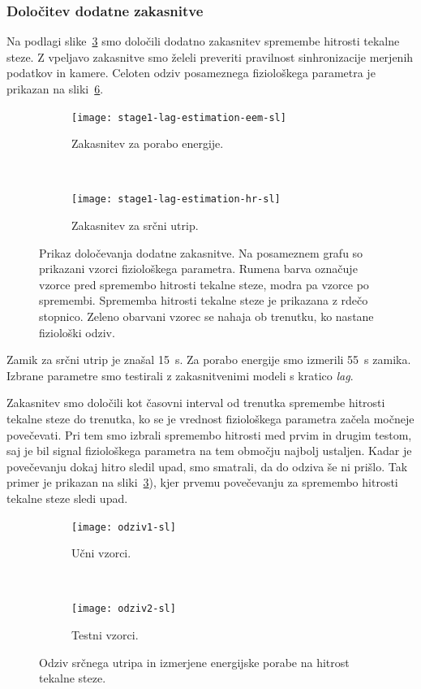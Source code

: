 \subsubsection{Določitev dodatne zakasnitve}
Na podlagi slike~\ref{fig:lag-estimation-stage1} smo določili dodatno zakasnitev spremembe hitrosti tekalne steze. Z vpeljavo zakasnitve smo želeli preveriti pravilnost sinhronizacije merjenih podatkov in kamere. Celoten odziv posameznega fiziološkega parametra je prikazan na sliki~\ref{fig:odziv-stage1}.


\begin{figure}[!htb]
	\centering
	\begin{subfigure}[t]{0.45\columnwidth}
		\texttt{[image: stage1-lag-estimation-eem-sl]}
		\caption{Zakasnitev za porabo energije.}
		\label{fig:lag-estimation-train-eem}
	\end{subfigure}
	~
	\begin{subfigure}[t]{0.45\columnwidth}
		\texttt{[image: stage1-lag-estimation-hr-sl]}
		\caption{Zakasnitev za srčni utrip.}
		\label{fig:lag-estimation-train-hr}
	\end{subfigure}
	\caption[Prikaz določevanja dodatne zakasnitve]{Prikaz določevanja dodatne zakasnitve. Na posameznem grafu so prikazani vzorci fiziološkega parametra. Rumena barva označuje vzorce pred spremembo hitrosti tekalne steze, modra pa vzorce po spremembi. Sprememba hitrosti tekalne steze je prikazana z rdečo stopnico. Zeleno obarvani vzorec se nahaja ob trenutku, ko nastane fiziološki odziv.}
	\label{fig:lag-estimation-stage1}
\end{figure}

Zamik za srčni utrip je znašal \SI{15}{\s}. Za porabo energije smo izmerili \SI{55}{\s} zamika. Izbrane parametre smo testirali z zakasnitvenimi modeli s kratico \textit{lag}.

Zakasnitev smo določili kot časovni interval od trenutka spremembe hitrosti tekalne steze do trenutka, ko se je vrednost fiziološkega parametra začela močneje povečevati. Pri tem smo izbrali spremembo hitrosti med prvim in drugim testom, saj je bil signal fiziološkega parametra na tem območju najbolj ustaljen. Kadar je povečevanju dokaj hitro sledil upad, smo smatrali, da do odziva še ni prišlo. Tak primer je prikazan na sliki~\ref{fig:lag-estimation-stage1}), kjer prvemu povečevanju za spremembo hitrosti tekalne steze sledi upad. 


\begin{figure}[!htb]
	\centering
	\begin{subfigure}[t]{0.45\columnwidth}
		\texttt{[image: odziv1-sl]}
		\caption{Učni vzorci.}
		\label{fig:odziv-ucnih-stage1}
	\end{subfigure}
	~
	\begin{subfigure}[t]{0.45\columnwidth}
		\texttt{[image: odziv2-sl]}
		\caption{Testni vzorci.}
		\label{fig:odziv-testnih-stage1}
	\end{subfigure}
	\caption[Odziv srčnega utripa in izmerjene energijske porabe na hitrost tekalne steze]{Odziv srčnega utripa in izmerjene energijske porabe na hitrost tekalne steze.}
	\label{fig:odziv-stage1}
\end{figure} 


